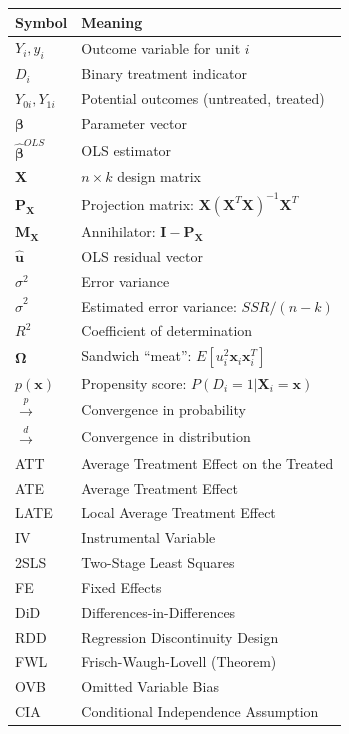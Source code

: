 \documentclass[11pt, twoside, openright]{book}
\theoremstyle{econstyle}
\theoremstyle{defstyle}
\begin{document}
\begin{tabular}{ll}
\toprule
\textbf{Symbol} & \textbf{Meaning} \\
\midrule
$Y_i, y_i$              & Outcome variable for unit $i$ \\
$D_i$                   & Binary treatment indicator \\
$Y_{0i}, Y_{1i}$        & Potential outcomes (untreated, treated) \\
$\boldsymbol{\beta}$    & Parameter vector \\
$\hat{\boldsymbol{\beta}}^{OLS}$ & OLS estimator \\
$\mathbf{X}$            & $n \times k$ design matrix \\
$\mathbf{P_X}$          & Projection matrix: $\mathbf{X}(\mathbf{X}^T\mathbf{X})^{-1}\mathbf{X}^T$ \\
$\mathbf{M_X}$          & Annihilator: $\mathbf{I} - \mathbf{P_X}$ \\
$\hat{\mathbf{u}}$      & OLS residual vector \\
$\sigma^2$              & Error variance \\
$\hat{\sigma}^2$        & Estimated error variance: $SSR/(n-k)$ \\
$R^2$                   & Coefficient of determination \\
$\boldsymbol{\Omega}$   & Sandwich ``meat'': $E[u_i^2 \mathbf{x}_i\mathbf{x}_i^T]$ \\
$p(\mathbf{x})$         & Propensity score: $P(D_i=1|\mathbf{X}_i=\mathbf{x})$ \\
$\xrightarrow{p}$       & Convergence in probability \\
$\xrightarrow{d}$       & Convergence in distribution \\
ATT                     & Average Treatment Effect on the Treated \\
ATE                     & Average Treatment Effect \\
LATE                    & Local Average Treatment Effect \\
IV                      & Instrumental Variable \\
2SLS                    & Two-Stage Least Squares \\
FE                      & Fixed Effects \\
DiD                     & Differences-in-Differences \\
RDD                     & Regression Discontinuity Design \\
FWL                     & Frisch-Waugh-Lovell (Theorem) \\
OVB                     & Omitted Variable Bias \\
CIA                     & Conditional Independence Assumption \\
\bottomrule
\end{tabular}
\end{document}
